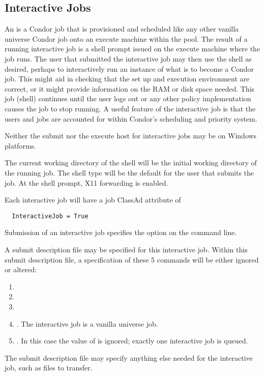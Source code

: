 \subsection{\label{sec:Submit-Interactive}Interactive Jobs}

An  is a Condor job that is provisioned and
scheduled like any other vanilla universe Condor job 
onto an execute machine within the pool.
The result of a running interactive job is a shell prompt 
issued on the execute machine where the job runs.
The user that submitted the interactive job may then use the
shell as desired,
perhaps to interactively run an instance of what is to become
a Condor job.
This might aid in checking that the set up and execution
environment are correct,
or it might provide information on the RAM or disk space needed.
This job (shell) continues until the user logs out or any other
policy implementation causes the job to stop running.
A useful feature of the interactive job is that the users and jobs
are accounted for within Condor's scheduling and priority system.

Neither the submit nor the execute host for interactive
jobs may be on Windows platforms. 

The current working directory of the shell will be the
initial working directory of the running job.
The shell type will be the default for the user that submits
the job.
At the shell prompt, X11 forwarding is enabled.

Each interactive job will have a job ClassAd attribute of 
\begin{verbatim}
  InteractiveJob = True
\end{verbatim}

Submission of an interactive job specifies the option 
on the  command line.

A submit description file may be specified for this interactive job.
Within this submit description file, 
a specification of these 5 commands will be either ignored or altered:
\begin{enumerate}
\item {}
\item {}
\item {}
\item {}.  The interactive job is a vanilla universe job. 
\item {} .  In this case the value of  is
ignored; exactly one interactive job is queued.
\end{enumerate}
The submit description file may specify anything else needed for
the interactive job, such as files to transfer.

